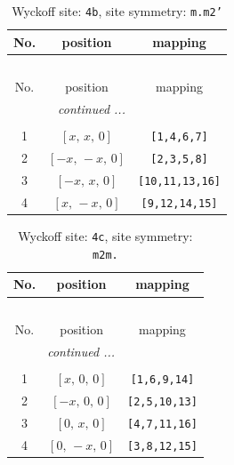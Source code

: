 \documentclass[fleqn,8pt]{jsarticle}
\begin{document}
\begin{longtable}{ccc}
\caption{Wyckoff site: {\tt 4b}, site symmetry: {\tt m.m2'}}
 \\
 \hline \hline
No. & position & mapping \\ \hline \endfirsthead

\multicolumn{2}{l}{\tablename\ \thetable{}} \\
 \hline \hline
No. & position & mapping \\ \hline \endhead

 \hline \hline
\multicolumn{2}{r}{\footnotesize\it continued ...} \\ \endfoot

 \hline \hline
\multicolumn{2}{r}{} \\ \endlastfoot

1 & $\left[ x,\, x,\, 0 \right]$ & {\tt [1,4,6,7]} \\ \hline
2 & $\left[ - x,\, - x,\, 0 \right]$ & {\tt [2,3,5,8]} \\ \hline
3 & $\left[ - x,\, x,\, 0 \right]$ & {\tt [10,11,13,16]} \\ \hline
4 & $\left[ x,\, - x,\, 0 \right]$ & {\tt [9,12,14,15]} \\
\end{longtable}
\renewcommand{\arraystretch}{1.2}
\begin{longtable}{ccc}
\caption{Wyckoff site: {\tt 4c}, site symmetry: {\tt m2m.}}
 \\
 \hline \hline
No. & position & mapping \\ \hline \endfirsthead

\multicolumn{2}{l}{\tablename\ \thetable{}} \\
 \hline \hline
No. & position & mapping \\ \hline \endhead

 \hline \hline
\multicolumn{2}{r}{\footnotesize\it continued ...} \\ \endfoot

 \hline \hline
\multicolumn{2}{r}{} \\ \endlastfoot

1 & $\left[ x,\, 0,\, 0 \right]$ & {\tt [1,6,9,14]} \\ \hline
2 & $\left[ - x,\, 0,\, 0 \right]$ & {\tt [2,5,10,13]} \\ \hline
3 & $\left[ 0,\, x,\, 0 \right]$ & {\tt [4,7,11,16]} \\ \hline
4 & $\left[ 0,\, - x,\, 0 \right]$ & {\tt [3,8,12,15]} \\
\end{longtable}
\end{document}
